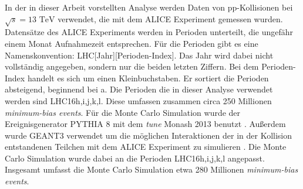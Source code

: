 In der in dieser Arbeit vorstellten Analyse werden Daten von pp-Kollisionen bei $\sqrt{s}=13\text{ TeV}$ verwendet, die mit dem ALICE Experiment gemessen wurden.
Datensätze des ALICE Experiments werden in Perioden unterteilt, die ungefähr einem Monat Aufnahmezeit entsprechen.
Für die Perioden gibt es eine Namenskonvention: LHC[Jahr][Perioden-Index].
Das Jahr wird dabei nicht vollständig angegeben, sondern nur die beiden letzten Ziffern.
Bei dem Perioden-Index handelt es sich um einen Kleinbuchstaben.
Er sortiert die Perioden absteigend, beginnend bei a.
Die Perioden die in dieser Analyse verwendet werden sind LHC16h,i,j,k,l.
Diese umfassen zusammen circa 250 Millionen \textit{minimum-bias events}.
\newline
Für die Monte Carlo Simulation wurde der Ereignisgenerator PYTHIA 8 mit dem \textit{tune} Monash 2013 benutzt \cite{thesis:Krissy}.
Außerdem wurde GEANT3 verwendet um die möglichen Interaktionen der in der Kollision entstandenen Teilchen mit dem ALICE Experiment zu simulieren \cite{Brun:118715}.
Die Monte Carlo Simulation wurde dabei an die  Perioden LHC16h,i,j,k,l angepasst.
Insgesamt umfasst die Monte Carlo Simulation etwa 280 Millionen \textit{minimum-bias events}.